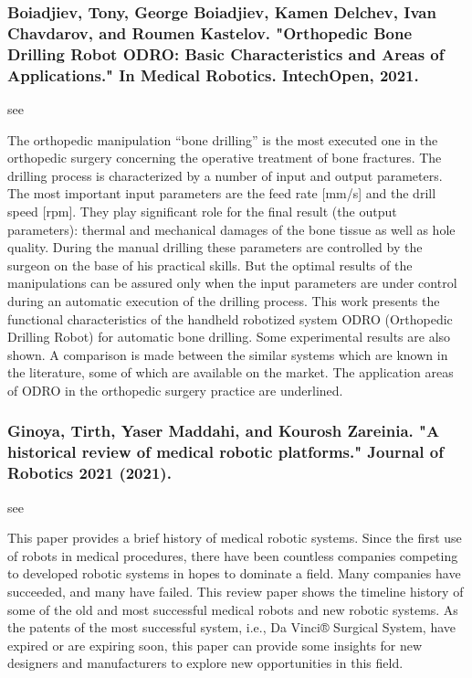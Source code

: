 \documentclass[conference]{IEEEtran}
\begin{document}
\medskip
\subsubsection{Boiadjiev, Tony, George Boiadjiev, Kamen Delchev, Ivan Chavdarov, and Roumen Kastelov. "Orthopedic Bone Drilling Robot ODRO: Basic Characteristics and Areas of Applications." In Medical Robotics. IntechOpen, 2021.}
see \cite{boiadjiev2021orthopedic}

The orthopedic manipulation “bone drilling” is the most executed one in the orthopedic surgery concerning the operative treatment of bone fractures. The drilling process is characterized by a number of input and output parameters. The most important input parameters are the feed rate [mm/s] and the drill speed [rpm]. They play significant role for the final result (the output parameters): thermal and mechanical damages of the bone tissue as well as hole quality. During the manual drilling these parameters are controlled by the surgeon on the base of his practical skills. But the optimal results of the manipulations can be assured only when the input parameters are under control during an automatic execution of the drilling process. This work presents the functional characteristics of the handheld robotized system ODRO (Orthopedic Drilling Robot) for automatic bone drilling. Some experimental results are also shown. A comparison is made between the similar systems which are known in the literature, some of which are available on the market. The application areas of ODRO in the orthopedic surgery practice are underlined.

\medskip
\subsubsection{Ginoya, Tirth, Yaser Maddahi, and Kourosh Zareinia. "A historical review of medical robotic platforms." Journal of Robotics 2021 (2021).}
see \cite{ginoya2021historical}

This paper provides a brief history of medical robotic systems. Since the first use of robots in medical procedures, there have been countless companies competing to developed robotic systems in hopes to dominate a field. Many companies have succeeded, and many have failed. This review paper shows the timeline history of some of the old and most successful medical robots and new robotic systems. As the patents of the most successful system, i.e., Da Vinci® Surgical System, have expired or are expiring soon, this paper can provide some insights for new designers and manufacturers to explore new opportunities in this field.
\end{document}
